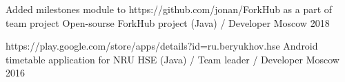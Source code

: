 \begin{cventries}

\cventry
{Added milestones module to https://github.com/jonan/ForkHub as a part of team project} %
{Open-sourse ForkHub project (Java) / Developer} %
{Moscow} %
{2018} %
{}


\cventry
{https://play.google.com/store/apps/details?id=ru.beryukhov.hse} %
{Android timetable application for NRU HSE (Java) / Team leader / Developer} %
{Moscow} %
{2016} %
{}











\end{cventries}
